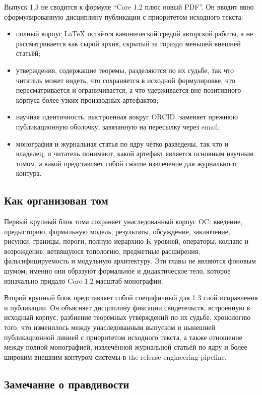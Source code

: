 Выпуск 1.3 не сводится к формуле ``Core 1.2 плюс новый PDF''.
Он вводит явно сформулированную дисциплину публикации с приоритетом исходного текста:

\begin{itemize}
\item полный корпус LaTeX остаётся канонической средой авторской работы, а не рассматривается как сырой архив, скрытый за гораздо меньшей внешней статьёй;
\item утверждения, содержащие теоремы, разделяются по их судьбе, так что читатель может видеть, что сохраняется в исходной формулировке, что пересматривается и ограничивается, а что удерживается вне позитивного корпуса более узких производных артефактов;
\item научная идентичность, выстроенная вокруг ORCID, заменяет прежнюю публикационную оболочку, завязанную на пересылку через email;
\item монография и журнальная статья по ядру чётко разведены, так что и владелец, и читатель понимают, какой артефакт является основным научным томом, а какой представляет собой сжатое извлечение для журнального контура.
\end{itemize}

\subsection{Как организован том}

Первый крупный блок тома сохраняет унаследованный корпус OC: введение, предысторию, формальную модель, результаты, обсуждение, заключение, рисунки, границы, пороги, полную иерархию K-уровней, операторы, коллапс и возрождение, ветвящуюся топологию, предметные расширения, фальсифицируемость и модульную архитектуру. Эти главы не являются фоновым шумом; именно они образуют формальное и дидактическое тело, которое изначально придало Core 1.2 масштаб монографии.

Второй крупный блок представляет собой специфичный для 1.3 слой исправления и публикации.
Он объясняет дисциплину фиксации свидетельств, встроенную в исходный корпус, разбиение теоремных утверждений по их судьбе, хронологию того, что изменилось между унаследованным выпуском и нынешней публикационной линией с приоритетом исходного текста, а также отношение между полной монографией, извлечённой журнальной статьёй по ядру и более широким внешним контуром системы в the release engineering pipeline.

\subsection{Замечание о правдивости}

